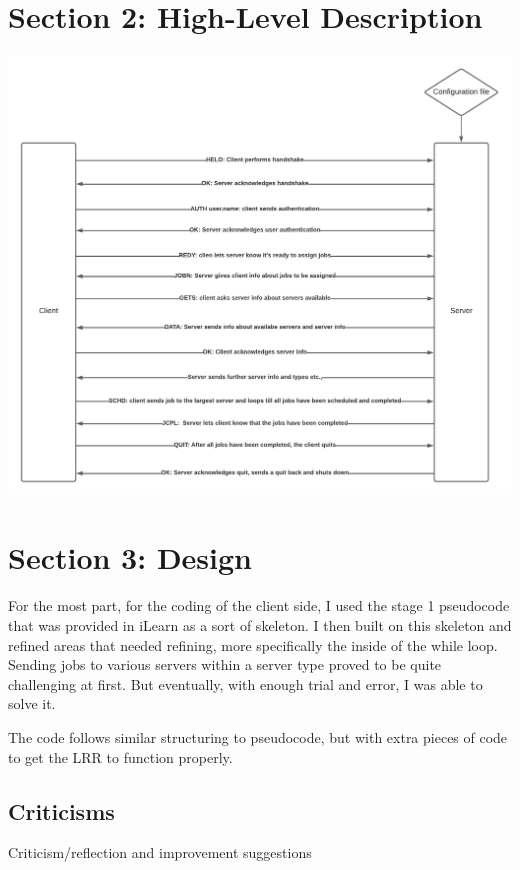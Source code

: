 \documentclass[a4paper]{article} %
\begin{document}
\section*{Section 2: High-Level Description}\label{sec:section2}

\begin{center}
    \includegraphics*[scale=0.676]{Flowchart.png}
\end{center}

\section*{Section 3: Design}\label{sec:section3}
For the most part, for the coding of the client side, I used the stage 1 pseudocode that was provided 
in iLearn as a sort of skeleton. I then built on this skeleton and refined areas that needed refining, 
more specifically the inside of the while loop. Sending jobs to various servers within a server type
proved to be quite challenging at first. But eventually, with enough trial and error, I was able to 
solve it. 

The code follows similar structuring to pseudocode, but with extra pieces of code to get the LRR to function 
properly. 
\subsection*{Criticisms}
Criticism/reflection and improvement suggestions
\end{document}
